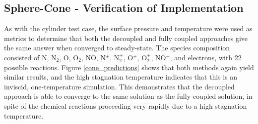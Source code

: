 \subsection{Sphere-Cone - Verification of Implementation} 

As with the cylinder test case, the surface pressure and temperature were used
as metrics to determine that both the decoupled and fully coupled approaches
give the same answer when converged to steady-state. The species composition
consisted of N, $\text{N}_2$, O, $\text{O}_2$, NO, N$^+$, $\text{N}_2^+$, O$^+$,
$\text{O}_2^+$, NO$^+$, and electrons, with 22 possible reactions. Figure
\ref{cone_predictions} shows that both methods again yield similar results, and
the high stagnation temperature indicates that this is an inviscid,
one-temperature simulation.  This demonstrates that the decoupled approach is
able to converge to the same solution as the fully coupled solution, in spite of
the chemical reactions proceeding very rapidly due to a high stagnation
temperature.

